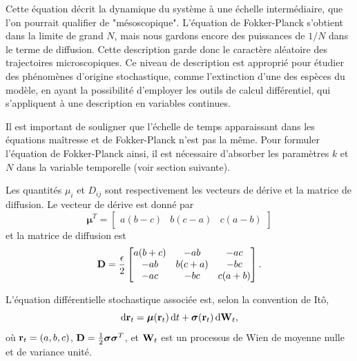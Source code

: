 \documentclass[openany,a4paper,12pt]{article}
\begin{document}
\par Cette équation décrit la dynamique du système à une échelle intermédiaire, que l'on pourrait qualifier de "mésoscopique". L'équation de Fokker-Planck s'obtient dans la limite de grand $N$, mais nous gardons encore des puissances de $1/N$ dans le terme de diffusion. Cette description garde donc le caractère aléatoire des trajectoires microscopiques. Ce niveau de description est approprié pour étudier des phénomènes d'origine stochastique, comme l'extinction d'une des espèces du modèle, en ayant la possibilité d'employer les outils de calcul différentiel, qui s'appliquent à une description en variables continues. 

\par Il est important de souligner que l'échelle de temps apparaissant dans les équations maîtresse et de Fokker-Planck n'est pas la même. Pour formuler l'équation de Fokker-Planck ainsi, il est nécessaire d'absorber les paramètres $k$ et $N$ dans la variable temporelle (voir section suivante). 

\par Les quantités $\mu_i$ et $D_{ij}$ sont respectivement les vecteurs de dérive et la matrice de diffusion. Le vecteur de dérive est donné par 
%
\begin{equation}\label{mu_i_expr}
	\boldsymbol\mu^T = 
	\begin{bmatrix} a(b-c) & b(c-a) & c(a-b) \end{bmatrix}
\end{equation}
%
et la matrice de diffusion est
%
\begin{equation}\label{D_ij_expr}
	\bold D = \frac{\epsilon}{2}
	\begin{bmatrix}
	a(b+c) & -ab & -ac \\
	-ab & b(c+a) & -bc \\
	-ac & -bc & c(a+b)
	\end{bmatrix}.
\end{equation}
%

\par L'équation différentielle stochastique associée est, selon la convention de Itô,
%
\begin{equation}\label{SDE_abc}
	\dd \bold r_t = \boldsymbol \mu (\bold r_t) \, \dd t + \boldsymbol \sigma(\bold r_t) \, \dd \bold W_t,
\end{equation}
où $\bold r_t = (a,b,c)$, $\bold D = \frac 12 \boldsymbol \sigma \boldsymbol \sigma^T$, et $\bold W_t$ est un processus de Wien de moyenne nulle et de variance unité.
\end{document}

